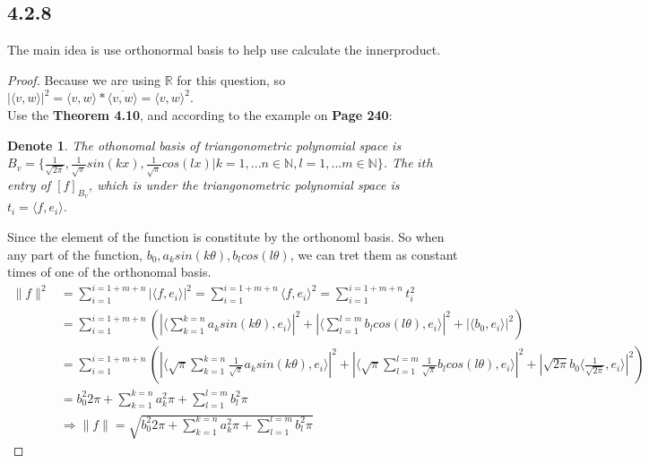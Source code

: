 \documentclass{article}
\newtheorem*{denote}{Denote}
\newtheorem*{proof}{Proof}
\begin{document}
\subsection*{4.2.8}
\noindent The main idea is use orthonormal basis to help use calculate the innerproduct.
\begin{proof}
    Because we are using $\mathbb{R}$ for this question, so $|\langle v, w\rangle|^2 = \langle v, w\rangle * \overline {\langle v, w\rangle} = \langle v, w\rangle^2$. \\
    Use the \textbf{Theorem 4.10}, and according to the example on \textbf{Page 240}:
    \begin{denote}
        The othonomal basis of triangonometric polynomial space is $ B_v = \{ \frac {1} {\sqrt {2 \pi}}, \frac{1}{\sqrt{\pi}} sin(kx), \frac{1}{\sqrt{\pi}} cos(lx) | k = 1, ... n \in \mathbb{N}, l = 1, ... m \in \mathbb{N} \}$. 
        The $ith$ entry of $[f]_{B_v}$, which is under the triangonometric polynomial space is $t_i = \langle f, e_i\rangle$. 
    \end{denote}
    Since the element of the function is constitute by the orthonoml basis. So when any part of the function, $b_0, a_ksin(k\theta), b_lcos(l\theta)$, we can tret them as constant times of one of the orthonomal basis.
    \begin{equation*}
        \begin{split}
            \|f\|^ 2 & = \sum_{i=1}^{i=1+m+n} | \langle f, e_i\rangle|^2 = \sum_{i=1}^{i=1+m+n}  \langle f, e_i\rangle ^2 = \sum_{i=1}^{i=1+m+n} t_i ^2 \\
            & = \sum_{i=1}^{i=1+m+n} (| \langle \sum_{k=1}^{k=n}a_ksin(k \theta) , e_i\rangle |^2 + | \langle \sum_{l=1}^{l=m}b_lcos(l \theta) , e_i\rangle |^2  + | \langle b_0, e_i \rangle|^2)\\
            & = \sum_{i=1}^{i=1+m+n} (| \langle \sqrt{\pi} \sum_{k=1}^{k=n} \frac{1}{\sqrt{\pi}}a_ksin(k \theta) , e_i\rangle |^2 + | \langle \sqrt{\pi} \sum_{l=1}^{l=m} \frac{1}{\sqrt{\pi}}b_lcos(l \theta) , e_i\rangle |^2  + | \sqrt{2\pi} b_0 \langle \frac{1}{\sqrt{2\pi}}, e_i \rangle|^2)\\
            & = {b_0 ^ 2}{2 \pi} + \sum_{k=1}^{k=n} {a_k ^2 }{\pi} + \sum_{l=1}^{l=m} {b_l ^2 }{\pi} \\
            & \Rightarrow \|f\| = \sqrt{{b_0^2}{{2 \pi}} + \sum_{k=1}^{k=n}  {a_k ^2 }{\pi} + \sum_{l=1}^{l=m}{b_l ^2 }{\pi}}
        \end{split}
    \end{equation*}
\end{proof}
\end{document}
